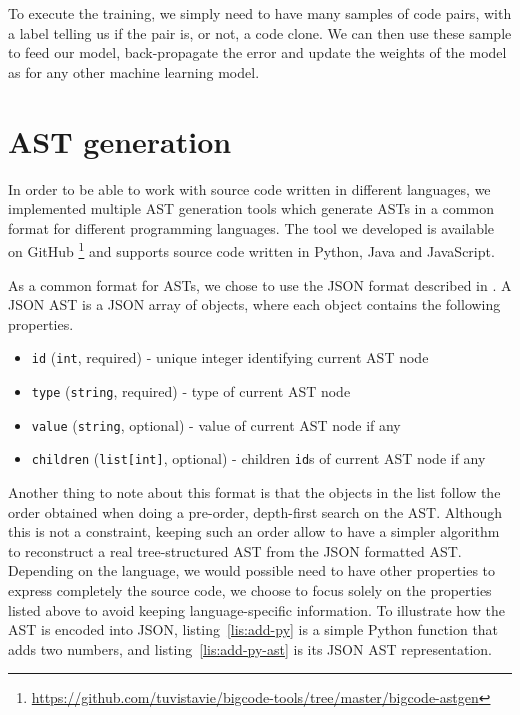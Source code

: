 To execute the training, we simply need to have many samples of code pairs,
with a label telling us if the pair is, or not, a code clone. We can then use
these sample to feed our model, back-propagate the error and update the weights
of the model as for any other machine learning model.
\section{\label{sec:ast-generation}AST generation}
In order to be able to work with source code written in different languages,
we implemented multiple AST generation tools which generate ASTs in a common
format for different programming languages. The tool we developed is available
on GitHub%
\footnote{\url{https://github.com/tuvistavie/bigcode-tools/tree/master/bigcode-astgen}}
and supports source code written in Python, Java and JavaScript.

As a common format for ASTs, we chose to use the JSON format described in
\cite{Raychev:2016:LPN:2837614.2837671}. A JSON AST is a JSON array of objects,
where each object contains the following properties.

\begin{itemize}
\item \lstinline{id} (\lstinline{int}, required) -  unique integer identifying
  current AST node
\item \lstinline{type} (\lstinline{string}, required) - type of current AST node
\item \lstinline{value} (\lstinline{string}, optional) - value of current AST
  node if any
\item \lstinline{children} (\lstinline{list[int]}, optional) - children
  \lstinline{id}s of current AST node if any
\end{itemize}
%
Another thing to note about this format is that the objects in the list follow
the order obtained when doing a pre-order, depth-first search on the AST.
Although this is not a constraint, keeping such an order allow to have a simpler
algorithm to reconstruct a real tree-structured AST from the JSON formatted AST.
Depending on the language, we would possible need to have other
properties to express completely the source code, we choose to focus solely on
the properties listed above to avoid keeping language-specific information. To
illustrate how the AST is encoded into JSON, listing~\ref{lis:add-py} is a
simple Python function that adds two numbers, and listing~\ref{lis:add-py-ast}
is its JSON AST representation.

